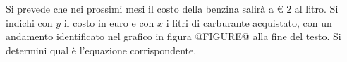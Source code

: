 Si prevede che nei prossimi mesi il costo della benzina salirà a € \(2\) al litro. Si indichi con \(y\) il costo in
euro e con \(x\) i litri di carburante acquistato, con un andamento identificato nel grafico in figura
@FIGURE@ alla fine del testo. 
Si determini qual è l’equazione
corrispondente. 